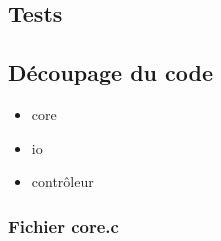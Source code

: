 \documentclass[a4paper,12pt,final] {article}
\begin{document}
\subsection{Tests}
\subsection{Découpage du code}

\begin{itemize}
\item{core}
\item{io}
\item{contrôleur}
\end{itemize}


\subsubsection{Fichier core.c}

\end{document}
